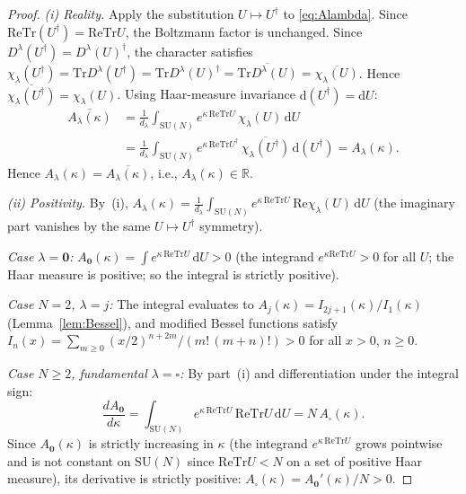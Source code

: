 \documentclass[11pt,a4paper]{amsart}
\theoremstyle{definition}
\newcommand{\SU}{\mathrm{SU}}
\newcommand{\R}{\mathbb{R}}
\newcommand{\re}{\mathrm{Re}}
\newcommand{\Tr}{\mathrm{Tr}}
\begin{document}
\begin{proof}
\emph{(i) Reality.}
Apply the substitution $U \mapsto U^\dagger$ to \eqref{eq:Alambda}.
Since $\re\Tr(U^\dagger)=\re\Tr U$, the Boltzmann factor is unchanged.
Since $D^\lambda(U^\dagger) = D^\lambda(U)^\dagger$, the character satisfies
$\chi_\lambda(U^\dagger) = \Tr D^\lambda(U^\dagger) = \Tr D^\lambda(U)^\dagger
= \overline{\Tr D^\lambda(U)} = \overline{\chi_\lambda(U)}$.
Hence $\overline{\chi_\lambda(U^\dagger)} = \chi_\lambda(U)$.
Using Haar-measure invariance $\mathrm{d}(U^\dagger) = \mathrm{d}U$:
\begin{align*}
\overline{A_\lambda(\kappa)}
&= \frac{1}{d_\lambda}\int_{\SU(N)} e^{\kappa\,\re\Tr U}\,\chi_\lambda(U)\,\mathrm{d}U \\
&= \frac{1}{d_\lambda}\int_{\SU(N)} e^{\kappa\,\re\Tr U^\dagger}\,
   \overline{\chi_\lambda(U^\dagger)}\,\mathrm{d}(U^\dagger)
= A_\lambda(\kappa).
\end{align*}
Hence $A_\lambda(\kappa) = \overline{A_\lambda(\kappa)}$, i.e., $A_\lambda(\kappa) \in \R$.

\emph{(ii) Positivity.}
By~(i), $A_\lambda(\kappa) = \frac{1}{d_\lambda}\int_{\SU(N)}
e^{\kappa\,\re\Tr U}\,\re\chi_\lambda(U)\,\mathrm{d}U$
(the imaginary part vanishes by the same $U\mapsto U^\dagger$ symmetry).

\textit{Case $\lambda = \mathbf{0}$:}
$A_\mathbf{0}(\kappa) = \int e^{\kappa\,\re\Tr U}\,\mathrm{d}U > 0$
(the integrand $e^{\kappa\re\Tr U} > 0$ for all $U$; the Haar measure is positive;
so the integral is strictly positive).

\textit{Case $N=2$, $\lambda = j$:}
The integral evaluates to $A_j(\kappa) = I_{2j+1}(\kappa)/I_1(\kappa)$
(Lemma~\ref{lem:Bessel}), and modified Bessel functions satisfy
$I_n(x) = \sum_{m \ge 0}(x/2)^{n+2m}/(m!\,(m+n)!) > 0$ for all $x>0$, $n\ge 0$.

\textit{Case $N\ge 2$, fundamental $\lambda = \square$:}
By part~(i) and differentiation under the integral sign:
\begin{equation}
\label{eq:dA0_dkappa}
  \frac{d A_\mathbf{0}}{d\kappa}
  = \int_{\SU(N)} e^{\kappa\,\re\Tr U}\,\re\Tr U\,\mathrm{d}U
  = N\,A_\square(\kappa).
\end{equation}
Since $A_\mathbf{0}(\kappa)$ is strictly increasing in $\kappa$
(the integrand $e^{\kappa\,\re\Tr U}$ grows pointwise and is not constant on
$\SU(N)$ since $\re\Tr U < N$ on a set of positive Haar measure),
its derivative is strictly positive: $A_\square(\kappa) = A_\mathbf{0}'(\kappa)/N > 0$.


\end{proof}
\end{document}
